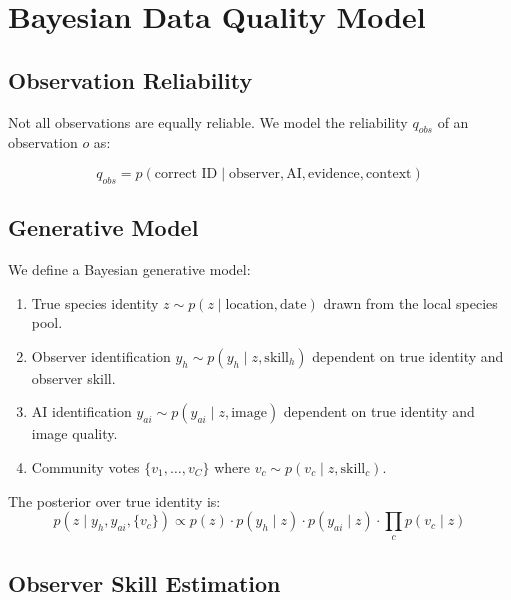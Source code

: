 \section{Bayesian Data Quality Model}

\label{sec:quality}

\subsection{Observation Reliability}

Not all observations are equally reliable. We model the reliability
$q_{obs}$ of an observation $o$ as:

\begin{equation}
  q_{obs} = p(\text{correct ID} \mid \text{observer}, \text{AI},
  \text{evidence}, \text{context})
\end{equation}

\subsection{Generative Model}

We define a Bayesian generative model:

\begin{enumerate}
  \item True species identity $z \sim p(z \mid \text{location}, \text{date})$
    drawn from the local species pool.
  \item Observer identification $y_h \sim p(y_h \mid z, \text{skill}_h)$
    dependent on true identity and observer skill.
  \item AI identification $y_{ai} \sim p(y_{ai} \mid z, \text{image})$
    dependent on true identity and image quality.
  \item Community votes $\{v_1, \ldots, v_C\}$ where
    $v_c \sim p(v_c \mid z, \text{skill}_c)$.
\end{enumerate}

The posterior over true identity is:
\begin{equation}
  p(z \mid y_h, y_{ai}, \{v_c\}) \propto
  p(z) \cdot p(y_h \mid z) \cdot p(y_{ai} \mid z) \cdot
  \prod_c p(v_c \mid z)
\end{equation}

\subsection{Observer Skill Estimation}


